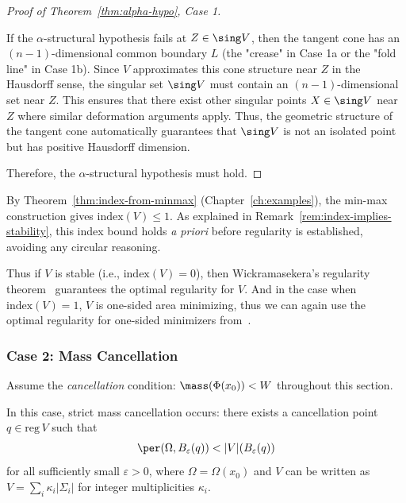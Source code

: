 \begin{proof}[Proof of Theorem~\ref{thm:alpha-hypo}, Case 1]
\begin{remark}

If the $\alpha$-structural hypothesis fails at $Z \in \sing V$, then the tangent cone has an $(n-1)$-dimensional common boundary $L$ (the "crease" in Case 1a or the "fold line" in Case 1b). Since $V$ approximates this cone structure near $Z$ in the Hausdorff sense, the singular set $\sing V$ must contain an $(n-1)$-dimensional set near $Z$. This ensures that there exist other singular points $X \in \sing V$ near $Z$ where similar deformation arguments apply. Thus, the geometric structure of the tangent cone automatically guarantees that $\sing V$ is not an isolated point but has positive Hausdorff dimension.
\end{remark}

Therefore, the $\alpha$-structural hypothesis must hold.
\end{proof}


By Theorem~\ref{thm:index-from-minmax} (Chapter~\ref{ch:examples}), the min-max construction gives $\text{index}(V) \leq 1$. As explained in Remark~\ref{rem:index-implies-stability}, this index bound holds \emph{a priori} before regularity is established, avoiding any circular reasoning.

Thus if $V$ is stable (i.e., $\mathrm{index}(V) = 0$), then
Wickramasekera's regularity theorem~\cite{Wic14} guarantees the optimal regularity for $V$. And in the case when
$\text{index}(V) = 1$, $V$ is one-sided area minimizing, thus we can again use the optimal regularity for one-sided
minimizers from~\cite{Liu19}.

\subsubsection{Case 2: Mass Cancellation}

Assume the \emph{cancellation} condition: $\mass(\Phi(x_0)) < W$ throughout this section.

In this case, strict mass cancellation occurs: there exists a cancellation point $q \in \text{reg}\, V$ such that
\[
    \per(\Omega, B_\varepsilon(q)) < |V|(B_\varepsilon(q))
\]
for all sufficiently small $\varepsilon > 0$, where $\Omega = \Omega(x_0)$ and $V$ can be written as
$V = \sum_i\kappa_i|\Sigma_i|$ for integer multiplicities $\kappa_i$.


